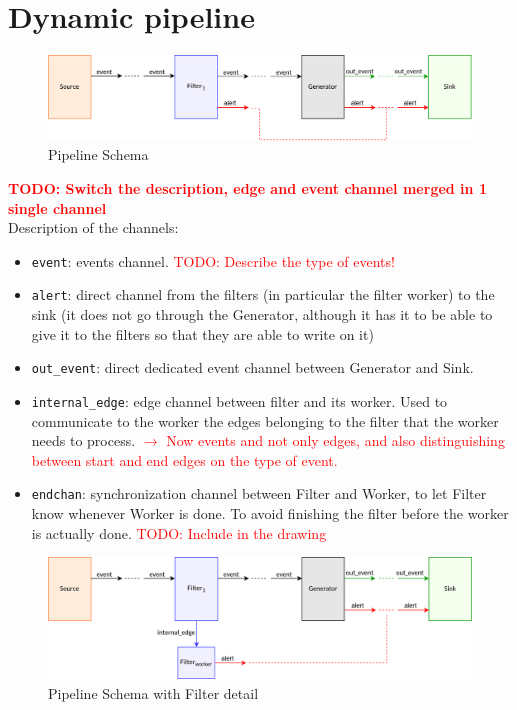 
\section{Dynamic pipeline}


\begin{figure}[H]
    \centering
    \includegraphics[scale = 0.7]{images/3-Engine/pipeline-schema.png}
    \caption{Pipeline Schema}
    \label{img:pipeline-schema}
\end{figure}

\textcolor{red}{\textbf{TODO: Switch the description, edge and event channel merged in 1 single channel}}\\

Description of the channels:
\begin{itemize}
    \item \texttt{event}: events channel. \textcolor{red}{TODO: Describe the type of events!}
    \item \texttt{alert}: direct channel from the filters (in particular the filter worker) to the sink (it does not go through the Generator, although it has it to be able to give it to the filters so that they are able to write on it)
    \item \texttt{out\_event}: direct dedicated event channel between Generator and Sink.
    \item \texttt{internal\_edge}: edge channel between filter and its worker. Used to communicate to the worker the edges belonging to the filter that the worker needs to process. \textcolor{red}{$\rightarrow$ Now events and not only edges, and also distinguishing between start and end edges on the type of event.}
    \item \texttt{endchan}: synchronization channel between Filter and Worker, to let Filter know whenever Worker is done. To avoid finishing the filter before the worker is actually done. \textcolor{red}{TODO: Include in the drawing}
  \end{itemize}


\begin{figure}[H]
  \centering
  \includegraphics[scale = 0.7]{images/3-Engine/pipeline-schema-filter-detail.png}
  \caption{Pipeline Schema with Filter detail}
  \label{img:pipeline-schema-0}
\end{figure}

